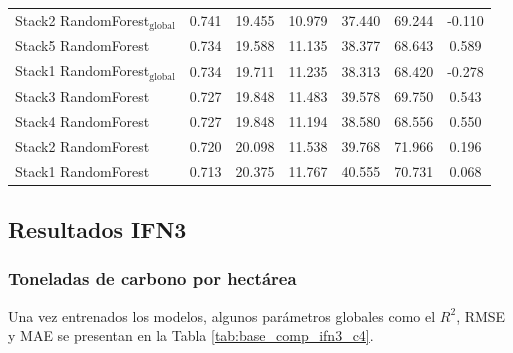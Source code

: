 \begin{table}
{\begin{tabular}{p{4.5cm}cccccc}
        Stack2 RandomForest$_{\text{global}}$ & 0.741 & 19.455 & 10.979 & 37.440 & 69.244 & -0.110 \\
        Stack5 RandomForest & 0.734 & 19.588 & 11.135 & 38.377 & 68.643 & 0.589 \\
        Stack1 RandomForest$_{\text{global}}$ & 0.734 & 19.711 & 11.235 & 38.313 & 68.420 & -0.278 \\
        Stack3 RandomForest & 0.727 & 19.848 & 11.483 & 39.578 & 69.750 & 0.543 \\
        Stack4 RandomForest & 0.727 & 19.848 & 11.194 & 38.580 & 68.556 & 0.550 \\
        Stack2 RandomForest & 0.720 & 20.098 & 11.538 & 39.768 & 71.966 & 0.196 \\
        Stack1 RandomForest & 0.713 & 20.375 & 11.767 & 40.555 & 70.731 & 0.068 \\
            \bottomrule
    \end{tabular}
    }
\end{table}

\subsection{Resultados IFN3}

\subsubsection{Toneladas de carbono por hectárea}


Una vez entrenados los modelos, algunos parámetros globales como el $R^2$, RMSE y MAE se presentan en la Tabla \ref{tab:base_comp_ifn3_c4}.

